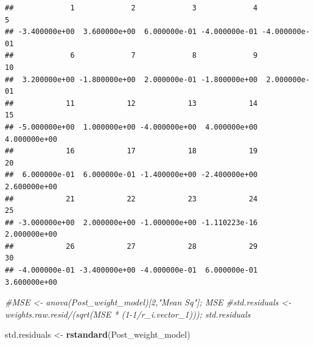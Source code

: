 \documentclass[12pt,]{article}
\newenvironment{Shaded}{\begin{snugshade}}{\end{snugshade}}
\newcommand{\KeywordTok}[1]{\textcolor[rgb]{0.13,0.29,0.53}{\textbf{#1}}}
\newcommand{\StringTok}[1]{\textcolor[rgb]{0.31,0.60,0.02}{#1}}
\newcommand{\CommentTok}[1]{\textcolor[rgb]{0.56,0.35,0.01}{\textit{#1}}}
\newcommand{\NormalTok}[1]{#1}
\begin{document}
\begin{verbatim}
##             1             2             3             4             5 
## -3.400000e+00  3.600000e+00  6.000000e-01 -4.000000e-01 -4.000000e-01 
##             6             7             8             9            10 
##  3.200000e+00 -1.800000e+00  2.000000e-01 -1.800000e+00  2.000000e-01 
##            11            12            13            14            15 
## -5.000000e+00  1.000000e+00 -4.000000e+00  4.000000e+00  4.000000e+00 
##            16            17            18            19            20 
##  6.000000e-01  6.000000e-01 -1.400000e+00 -2.400000e+00  2.600000e+00 
##            21            22            23            24            25 
## -3.000000e+00  2.000000e+00 -1.000000e+00 -1.110223e-16  2.000000e+00 
##            26            27            28            29            30 
## -4.000000e-01 -3.400000e+00 -4.000000e-01  6.000000e-01  3.600000e+00
\end{verbatim}

\begin{Shaded}
\begin{Highlighting}[]
\CommentTok{#MSE <- anova(Post_weight_model)[2,"Mean Sq"]; MSE}
\CommentTok{#std.residuals <- weights.raw.resid/(sqrt(MSE * (1-1/r_i.vector_1))); std.residuals}

\NormalTok{std.residuals <-}\StringTok{ }\KeywordTok{rstandard}\NormalTok{(Post_weight_model)}
\end{Highlighting}
\end{Shaded}
\end{document}
